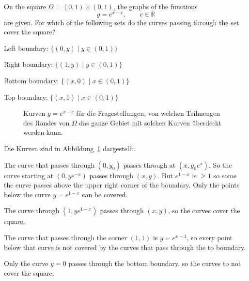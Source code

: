 On the square $\Omega = (0,1)\times (0,1)$, the graphs of the functions
\[
y = e^{x-c},\qquad c \in\mathbb{R}
\]
are given.
For which of the following sets do the curves passing through the set
cover the square?
\begin{teilaufgaben}
\item Left boundary: $\{(0,y)\mid y\in (0,1)\}$
\item Right boundary: $\{(1,y)\mid y\in (0,1)\}$
\item Bottom boundary: $\{(x,0)\mid x\in (0,1)\}$
\item Top boundary: $\{(x,1)\mid x\in (0,1)\}$
\end{teilaufgaben}

\begin{loesung}
\begin{figure}
\centering
{}
\caption{Kurven $y=e^{x-c}$ für die Fragestellungen, von welchen Teilmengen
des Randes von $\Omega$ das ganze Gebiet mit solchen Kurven überdeckt
werden kann.
\label{30000031:fig}}
\end{figure}
Die Kurven sind in Abbildung~\ref{30000031:fig} dargestellt.
\begin{teilaufgaben}
\item
The curve that passes through $(0,y_0)$ passes through
at $(x,y_0e^x)$.
So the curve starting at $(0,ye^{-x})$ passes through $(x,y)$.
But $e^{1-x}$ is $\ge 1$ so some the curve passes above
the upper right corner of the boundary.
Only the points below the curve $y=e^{1-x}$ can be covered.
\item
The curve through $(1,ye^{1-x})$ passes through $(x,y)$, so the curves
cover the square.
\item
The curve that passes through the corner $(1,1)$ is $y=e^{x-1}$, so
every point below that curve is not covered by the curves that pass
through the to boundary.
\item
Only the curve $y=0$ passes through the bottom boundary, so the curves
to not cover the square.
\end{teilaufgaben}
\end{loesung}
